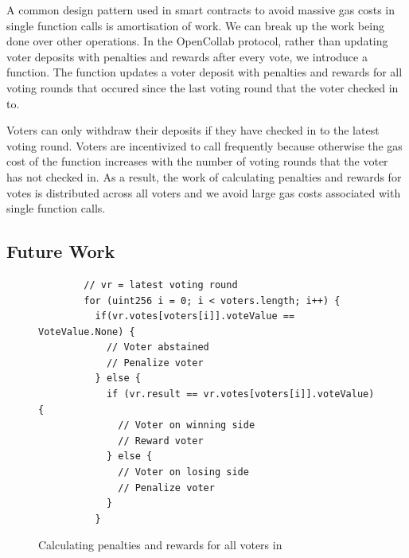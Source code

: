 A common design pattern used in smart contracts to avoid massive gas costs in
single function calls is amortisation of work\cite{amortisationWork}. We can
break up the work being done over other operations. In the OpenCollab protocol,
rather than updating voter deposits with penalties and rewards after every vote,
we introduce a  function. The function updates a voter
deposit with penalties and rewards for all voting rounds that occured since the
last voting round that the voter checked in to.

Voters can only withdraw their deposits if they have checked in to the latest voting round. Voters are
incentivized to call  frequently because otherwise the
gas cost of the function increases with the number of voting rounds that the
voter has not checked in. As a result, the work of calculating penalties and rewards for votes is distributed across
all voters and we avoid large gas costs associated with single function calls.

\subsection{Future Work}

\begin{figure}
  \begin{minipage}{\textwidth}
    \begin{framed}
      \begin{lstlisting}
        // vr = latest voting round
        for (uint256 i = 0; i < voters.length; i++) {
          if(vr.votes[voters[i]].voteValue == VoteValue.None) {
            // Voter abstained
            // Penalize voter
          } else {
            if (vr.result == vr.votes[voters[i]].voteValue) {
              // Voter on winning side
              // Reward voter
            } else {
              // Voter on losing side
              // Penalize voter
            }
          }
        \end{lstlisting}
    \end{framed}
  \end{minipage}
  \caption{Calculating penalties and rewards for all voters in }
\end{figure}

